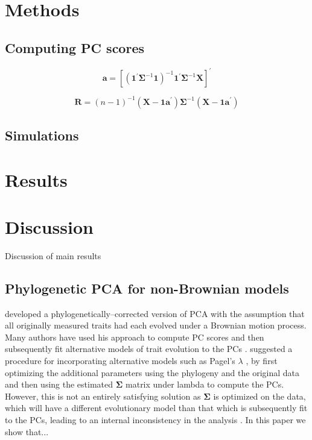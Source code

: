 \documentclass[a4paper,12pt]{article}
\begin{document}
\section{Methods}
\subsection{Computing PC scores}

\begin{equation}\label{eq:a}
\mathbf{a}=[(\mathbf{1}^\prime \mathbf{\Sigma}^{-1} \mathbf{1})^{-1} 
\mathbf{1}^\prime \mathbf{\Sigma}^{-1} \mathbf{X}]^\prime
\end{equation}

\begin{equation}\label{eq:r}
\mathbf{R} = (n-1)^{-1} (\mathbf{X} - \mathbf{1a}^\prime ) \mathbf{\Sigma}^{-1} 
(\mathbf{X} - \mathbf{1a}^\prime )
\end{equation}

\subsection{Simulations}

\section{Results}

\section{Discussion}

Discussion of main results

\subsection{Phylogenetic PCA for non-Brownian models}
\citet{Revell2008} developed a phylogenetically--corrected version of PCA with the assumption that all originally measured traits had each evolved under a Brownian motion process. Many authors have used his approach to compute PC scores and then subsequently fit alternative models of trait evolution to the PCs \citep{somethings}. \citet{Revell2008} suggested a procedure for incorporating alternative models such as Pagel's $\lambda$ \citep{Pagel1999}, by first optimizing the additional parameters using the phylogeny and the original data \citep[e.g., following the method of][]{Freckleton2002} and then using the estimated $\mathbf{\Sigma}$ matrix under lambda to compute the PCs. However, this is not an entirely satisfying solution as $\mathbf{\Sigma}$ is optimized on the data, which will have a different evolutionary model than that which is subsequently fit to the PCs, leading to an internal inconsistency in the analysis \citep[as pointed out by][this may lead to different estimates of the same parameter at different steps in the analysis]{Revell2008}. In this paper we show that...
\end{document}

